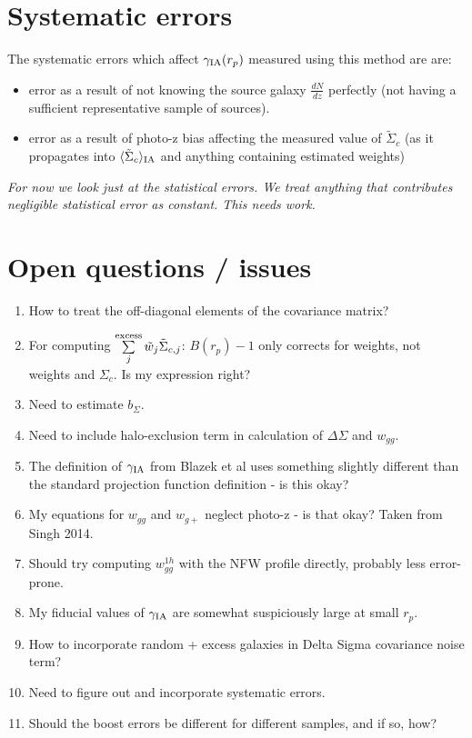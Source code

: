\documentclass[onecolumn,amsmath,aps,fleqn, superscriptaddress]{revtex4}
\begin{document}
\section{Systematic errors}
The systematic errors which affect $\gamma_{\rm IA}(r_p)$ measured using this method are are:
\begin{itemize}
\item{error as a result of not knowing the source galaxy $\frac{dN}{dz}$ perfectly (not having a sufficient representative sample of sources).}
\item{error as a result of photo-z bias affecting the measured value of $\tilde{\Sigma}_c$ (as it propagates into $\langle \tilde{\Sigma}_c\rangle_{\rm IA}$ and anything containing estimated weights)}
\end{itemize}
{\it For now we look just at the statistical errors. We treat anything that contributes negligible statistical error as constant. This needs work.}

\section{Open questions / issues}
\begin{enumerate}
\item{How to treat the off-diagonal elements of the covariance matrix?}
\item{For computing $\sum\limits_{j}^{\rm excess} \tilde{w}_j \tilde{\Sigma}_{c,j}$: $B(r_p) - 1$ only corrects for weights, not weights and $\Sigma_c$. Is my expression right?}
\item{Need to estimate $b_{\Sigma}$.}
\item{Need to include halo-exclusion term in calculation of $\Delta \Sigma$ and $w_{gg}$.}
\item{The definition of $\gamma_{\rm IA}$ from Blazek et al uses something slightly different than the standard projection function definition - is this okay?}
\item{My equations for $w_{gg}$ and $w_{g+}$ neglect photo-z - is that okay? Taken from Singh 2014.}
\item{Should try computing $w_{gg}^{1h}$ with the NFW profile directly, probably less error-prone.}
\item{My fiducial values of $\gamma_{\rm IA}$ are somewhat suspiciously large at small $r_p$.}
\item{How to incorporate random + excess galaxies in Delta Sigma covariance noise term?}
\item{Need to figure out and incorporate systematic errors.}
\item{Should the boost errors be different for different samples, and if so, how?}
\end{enumerate}











\end{document}
